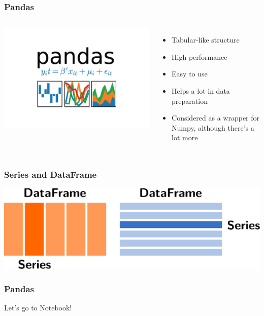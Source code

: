 \documentclass[aspectratio=169]{beamer}
\begin{document}
\begin{frame}
    \frametitle{Pandas}
    \begin{columns}
            \includegraphics[width=\columnwidth]{images/pandas-logo.png}
            \begin{itemize}
                \item Tabular-like structure
                \item High performance
                \item Easy to use
                \item Helps a lot in data preparation
                \item Considered as a wrapper for Numpy, although there's a lot more
            \end{itemize}
    \end{columns}
\end{frame}

\begin{frame}
    \frametitle{Series and DataFrame}
    \includegraphics[width=\textwidth]{images/df-series.pdf}
\end{frame}

\begin{frame}
    \frametitle{Pandas}
    \centering
    { \Huge Let's go to Notebook! }
\end{frame}
\end{document}
